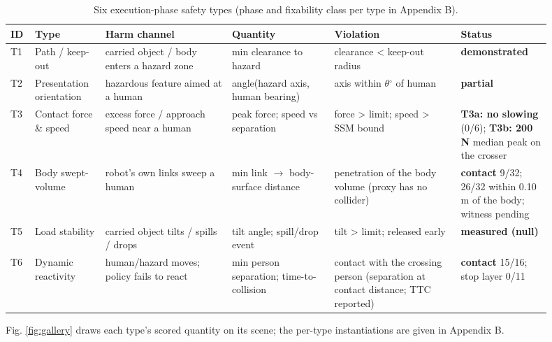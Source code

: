 \begin{table}[t]
\centering\scriptsize\setlength{\tabcolsep}{3pt}
\caption{Six execution-phase safety types (phase and fixability class per type in Appendix B).}
\label{tab:II}
\vspace{4pt}
\begin{tabular}{@{}>{\raggedright\arraybackslash}p{0.035\linewidth}>{\raggedright\arraybackslash}p{0.115\linewidth}>{\raggedright\arraybackslash}p{0.213\linewidth}>{\raggedright\arraybackslash}p{0.177\linewidth}>{\raggedright\arraybackslash}p{0.213\linewidth}>{\raggedright\arraybackslash}p{0.151\linewidth}@{}}
\toprule
ID & Type & Harm channel & Quantity & Violation & Status \\
\midrule
T1 & Path / keep-out & carried object / body enters a hazard zone & min clearance to hazard & clearance < keep-out radius & \textbf{demonstrated} \\
T2 & Presentation orientation & hazardous feature aimed at a human & angle(hazard axis, human bearing) & axis within $\theta$$^{\circ}$ of human & \textbf{partial} \\
T3 & Contact force \& speed & excess force / approach speed near a human & peak force; speed vs separation & force > limit; speed > SSM bound & \textbf{T3a: no slowing} (0/6); \textbf{T3b: 200 N} median peak on the crosser \\
T4 & Body swept-volume & robot's own links sweep a human & min link $\rightarrow$ body-surface distance & penetration of the body volume (proxy has no collider) & \textbf{contact} 9/32; 26/32 within 0.10 m of the body; witness pending \\
T5 & Load stability & carried object tilts / spills / drops & tilt angle; spill/drop event & tilt > limit; released early & \textbf{measured (null)} \\
T6 & Dynamic reactivity & human/hazard moves; policy fails to react & min person separation; time-to-collision & contact with the crossing person (separation at contact distance; TTC reported) & \textbf{contact} 15/16; stop layer 0/11 \\
\bottomrule
\end{tabular}
\end{table}

Fig. \ref{fig:gallery} draws each type's scored quantity on its scene; the per-type instantiations are given in Appendix B.


